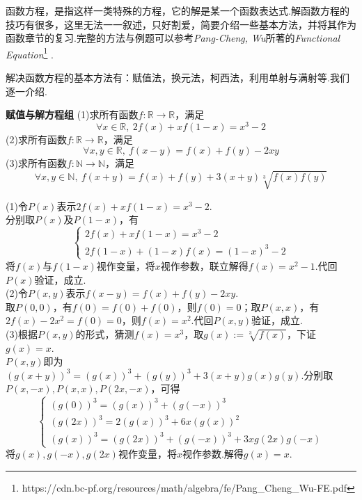 \documentclass[lang=cn, zihao=5]{elegantbook}
\newcommand{\R}{\mathbb{R}}
\newcommand{\examplefont}[1]{\color{mgreen} \textbf{#1}}
\begin{document}
函数方程，是指这样一类特殊的方程，它的解是某一个函数表达式.解函数方程的技巧有很多，这里无法一一叙述，只好割爱，简要介绍一些基本方法，并将其作为函数章节的复习.完整的方法与例题可以参考\textit{Pang-Cheng, Wu}所著的\textit{Functional Equation}\footnote{https://cdn.bc-pf.org/resources/math/algebra/fe/Pang\_Cheng\_Wu-FE.pdf} .

解决函数方程的基本方法有：赋值法，换元法，柯西法，利用单射与满射等.我们逐一介绍.

\begin{example}{\examplefont{赋值与解方程组}}
	(1)求所有函数$f:\R \to \R$，满足$$\forall x \in \R ,~2f(x)+xf(1-x)=x^3-2$$
	(2)求所有函数$f:\R \to \R$，满足$$\forall x,y \in \R,~f(x-y)=f(x)+f(y)-2xy$$
	(3)求所有函数$f:\mathbb{N} \to \mathbb{N}$，满足$$\forall x,y \in \mathbb{N},~f(x+y)=f(x)+f(y)+3(x+y)\sqrt[3]{f(x)f(y)}$$
\end{example}
\begin{solution}
	(1)令$P(x)$表示$2f(x)+xf(1-x)=x^3-2$. \\
	分别取$P(x)$及$P(1-x)$，有$$\begin{cases}
		2f(x)+xf(1-x)=x^3-2 \\
		2f(1-x)+(1-x)f(x)=(1-x)^3-2
	\end{cases}$$
	将$f(x)$与$f(1-x)$视作变量，将$x$视作参数，联立解得$f(x)=x^2-1$.代回$P(x)$验证，成立. \\
	(2)令$P(x,y)$表示$f(x-y)=f(x)+f(y)-2xy$. \\
	取$P(0,0)$，有$f(0)=f(0)+f(0)$，则$f(0)=0$；取$P(x,x)$，有$2f(x)-2x^2=f(0)=0$，则$f(x)=x^2$.代回$P(x,y)$验证，成立. \\
	(3)根据$P(x,y)$的形式，猜测$f(x)=x^3$，取$g(x):=\sqrt[3]{f(x)}$，下证$g(x)=x$. \\
	$P(x,y)$即为$(g(x+y))^3=(g(x))^3+(g(y))^3+3(x+y)g(x)g(y)$.分别取$P(x,-x),P(x,x),P(2x,-x)$，可得$$\begin{cases}
		(g(0))^3 = (g(x))^3 + (g(-x))^3 \\
		(g(2x))^3 = 2(g(x))^3 + 6x(g(x))^2 \\
		(g(x))^3 = (g(2x))^3 + (g(-x))^3 + 3xg(2x)g(-x)
	\end{cases}$$
	将$g(x),g(-x),g(2x)$视作变量，将$x$视作参数.解得$g(x)=x$.
\end{solution}
\end{document}
